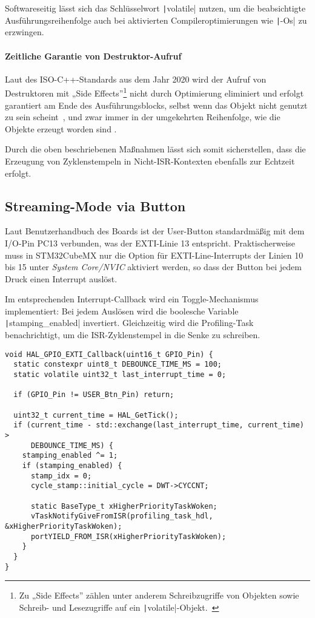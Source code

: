 Softwareseitig lässt sich das Schlüsselwort \texttt|volatile| nutzen,
um die beabsichtigte Ausführungsreihenfolge auch bei aktivierten
Compileroptimierungen wie \texttt|-Os| zu erzwingen.

\paragraph{Zeitliche Garantie von Destruktor-Aufruf}

Laut des ISO-C++-Standards aus dem Jahr 2020 wird der Aufruf von Destruktoren
mit „Side Effects”\footnote{Zu „Side Effects” zählen unter anderem
Schreibzugriffe von Objekten sowie Schreib- und Lesezugriffe auf ein
\texttt|volatile|-Objekt.~\cite{cppreference_eval_order}} nicht durch
Optimierung eliminiert und erfolgt garantiert am Ende des Ausführungsblocks,
selbst wenn das Objekt nicht genutzt zu sein scheint~\cite[§6.7.5.4 Abs.
3]{iso_iec_14882_2020}, und zwar immer in der umgekehrten Reihenfolge, wie die
Objekte erzeugt worden sind \cite{isocpp_dtor_order}.

Durch die oben beschriebenen Maßnahmen lässt sich somit sicherstellen, dass die
Erzeugung von Zyklenstempeln in Nicht-ISR-Kontexten ebenfalls zur Echtzeit
erfolgt.

\subsection{Streaming-Mode via Button}

Laut Benutzerhandbuch des Boards ist der User-Button standardmäßig mit dem
I/O-Pin PC13 verbunden, was der \ac{EXTI}-Linie 13 entspricht. Praktischerweise
muss in STM32CubeMX nur die Option für EXTI-Line-Interrupts der Linien 10 bis 15
unter \textit{System Core/NVIC} aktiviert werden, so dass der Button bei jedem
Druck einen Interrupt auslöst.

Im entsprechenden Interrupt-Callback wird ein Toggle-Mechanismus implementiert:
Bei jedem Auslösen wird die boolesche Variable
\texttt|stamping_enabled| invertiert. Gleichzeitig wird die
Profiling-Task benachrichtigt, um die ISR-Zyklenstempel in die Senke zu
schreiben.

\begin{code}
\begin{verbatim}
void HAL_GPIO_EXTI_Callback(uint16_t GPIO_Pin) {
  static constexpr uint8_t DEBOUNCE_TIME_MS = 100;
  static volatile uint32_t last_interrupt_time = 0;

  if (GPIO_Pin != USER_Btn_Pin) return;

  uint32_t current_time = HAL_GetTick();
  if (current_time - std::exchange(last_interrupt_time, current_time) >
      DEBOUNCE_TIME_MS) {
    stamping_enabled ^= 1;
    if (stamping_enabled) {
      stamp_idx = 0;
      cycle_stamp::initial_cycle = DWT->CYCCNT;

      static BaseType_t xHigherPriorityTaskWoken;
      vTaskNotifyGiveFromISR(profiling_task_hdl, &xHigherPriorityTaskWoken);
      portYIELD_FROM_ISR(xHigherPriorityTaskWoken);
    }
  }
}
\end{verbatim}
\end{code}

